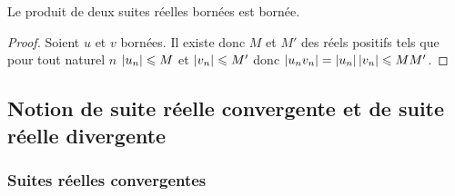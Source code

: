 \begin{prop}
  Le produit de deux suites réelles bornées est bornée.
\end{prop}
\begin{proof}
  Soient $u$ et $v$ bornées. Il existe donc $M$ et $M'$ des réels positifs tels que pour tout naturel $n$ $\left\lvert u_n\right\rvert\leqslant M$ et $\left\lvert v_n\right\rvert\leqslant M'$ donc $\left\lvert u_n v_n\right\rvert=\left\lvert u_n\right\rvert\left\lvert v_n\right\rvert\leqslant MM'$. 
\end{proof}

\subsection{Notion de suite réelle convergente et de suite réelle divergente}

\subsubsection{Suites réelles convergentes}

